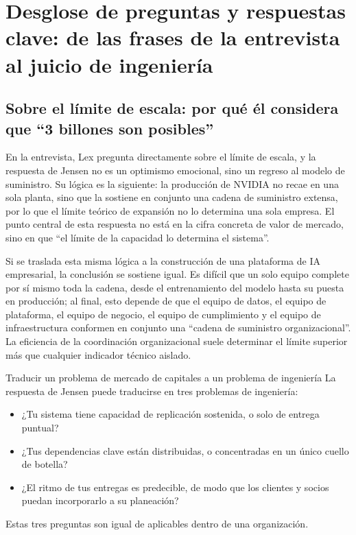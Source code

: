 \section{Desglose de preguntas y respuestas clave: de las frases de la entrevista al juicio de ingeniería}

\subsection{Sobre el límite de escala: por qué él considera que ``3 billones son posibles''}

En la entrevista, Lex pregunta directamente sobre el límite de escala, y la respuesta de Jensen no es un optimismo emocional, sino un regreso al modelo de suministro. Su lógica es la siguiente: la producción de NVIDIA no recae en una sola planta, sino que la sostiene en conjunto una cadena de suministro extensa, por lo que el límite teórico de expansión no lo determina una sola empresa. El punto central de esta respuesta no está en la cifra concreta de valor de mercado, sino en que ``el límite de la capacidad lo determina el sistema''.

Si se traslada esta misma lógica a la construcción de una plataforma de IA empresarial, la conclusión se sostiene igual. Es difícil que un solo equipo complete por sí mismo toda la cadena, desde el entrenamiento del modelo hasta su puesta en producción; al final, esto depende de que el equipo de datos, el equipo de plataforma, el equipo de negocio, el equipo de cumplimiento y el equipo de infraestructura conformen en conjunto una ``cadena de suministro organizacional''. La eficiencia de la coordinación organizacional suele determinar el límite superior más que cualquier indicador técnico aislado.

\begin{knowledgebox}{Traducir un problema de mercado de capitales a un problema de ingeniería}
La respuesta de Jensen puede traducirse en tres problemas de ingeniería:
\begin{itemize}
    \item ¿Tu sistema tiene capacidad de replicación sostenida, o solo de entrega puntual?
    \item ¿Tus dependencias clave están distribuidas, o concentradas en un único cuello de botella?
    \item ¿El ritmo de tus entregas es predecible, de modo que los clientes y socios puedan incorporarlo a su planeación?
\end{itemize}
Estas tres preguntas son igual de aplicables dentro de una organización.
\end{knowledgebox}

